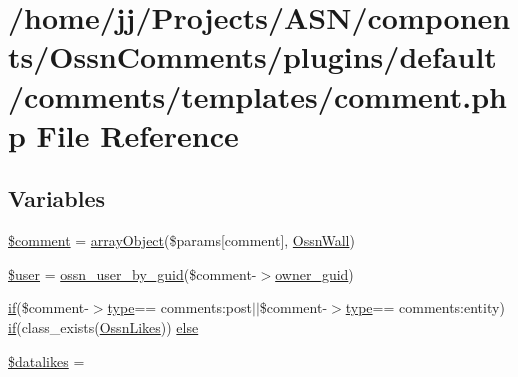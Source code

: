 \hypertarget{plugins_2default_2comments_2templates_2comment_8php}{}\section{/home/jj/\+Projects/\+A\+S\+N/components/\+Ossn\+Comments/plugins/default/comments/templates/comment.php File Reference}
\label{plugins_2default_2comments_2templates_2comment_8php}
\subsection*{Variables}
\begin{DoxyCompactItemize}
\item 
\hyperlink{plugins_2default_2comments_2templates_2comment_8php_a536677acc0163c53c067316a97456e6c}{\$comment} = \hyperlink{ossn_8lib_8route_8php_a79ce899ce98ad90b10fee0b598e1bd5a}{array\+Object}(\$params\mbox{[}\textquotesingle{}comment\textquotesingle{}\mbox{]}, \textquotesingle{}\hyperlink{class_ossn_wall}{Ossn\+Wall}\textquotesingle{})
\item 
\hyperlink{plugins_2default_2comments_2templates_2comment_8php_a598ca4e71b15a1313ec95f0df1027ca5}{\$user} = \hyperlink{ossn_8lib_8users_8php_aaee344fada9e6e15470587c7cd94ea8b}{ossn\+\_\+user\+\_\+by\+\_\+guid}(\$comment-\/$>$\hyperlink{user_8php_a307051fefc937afd02c509c55646f50b}{owner\+\_\+guid})
\item 
\hyperlink{jquery_8tokeninput_8js_ad8dd46a3cbc004569e34401e9e71771a}{if}(\$comment-\/$>$\hyperlink{_ossn_wall_2actions_2wall_2post_2group_8php_a2dc1bb4e1ed0029daa81ac0776b14b51}{type}== \textquotesingle{}comments\+:post\textquotesingle{}$\vert$$\vert$\$comment-\/$>$\hyperlink{_ossn_wall_2actions_2wall_2post_2group_8php_a2dc1bb4e1ed0029daa81ac0776b14b51}{type}== \textquotesingle{}comments\+:entity\textquotesingle{}) \hyperlink{jquery_8tokeninput_8js_ad8dd46a3cbc004569e34401e9e71771a}{if}(class\+\_\+exists(\textquotesingle{}\hyperlink{class_ossn_likes}{Ossn\+Likes}\textquotesingle{})) \hyperlink{plugins_2default_2comments_2templates_2comment_8php_a0fee8603373d27f87efcccd55f4be6dc}{else}
\item 
\hyperlink{plugins_2default_2comments_2templates_2comment_8php_a68bc486a87d1dcb8365971b179013c78}{\$datalikes} = \textquotesingle{}\textquotesingle{}
\item 
$$
\end{DoxyCompactItemize}
